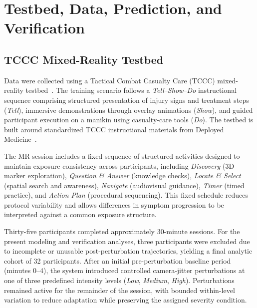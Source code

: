 \documentclass[review]{vgtc}              %
\begin{document}
\section{Testbed, Data, Prediction, and Verification}\label{sec:method}

\subsection{TCCC Mixed-Reality Testbed}\label{sec:testbed}

Data were collected using a Tactical Combat Casualty Care (TCCC) mixed-reality testbed~\cite{Harper2021AR, Stanney2022AUGMED, Laxton2025MobileXR}. The training scenario follows a \textit{Tell--Show--Do} instructional sequence comprising structured presentation of injury signs and treatment steps (\textit{Tell}), immersive demonstrations through overlay animations (\textit{Show}), and guided participant execution on a manikin using casualty-care tools (\textit{Do}). The testbed is built around standardized TCCC instructional materials from Deployed Medicine~\cite{DeployedMedicine2025}.

The MR session includes a fixed sequence of structured activities designed to maintain exposure consistency across participants, including \textit{Discovery} (3D marker exploration), \textit{Question \& Answer} (knowledge checks), \textit{Locate \& Select} (spatial search and awareness), \textit{Navigate} (audiovisual guidance), \textit{Timer} (timed practice), and \textit{Action Plan} (procedural sequencing). This fixed schedule reduces protocol variability and allows differences in symptom progression to be interpreted against a common exposure structure.

Thirty-five participants completed approximately 30-minute sessions. For the present modeling and verification analyses, three participants were excluded due to incomplete or unusable post-perturbation trajectories, yielding a final analytic cohort of 32 participants. After an initial pre-perturbation baseline period (minutes 0--4), the system introduced controlled camera-jitter perturbations at one of three predefined intensity levels (\textit{Low}, \textit{Medium}, \textit{High}). Perturbations remained active for the remainder of the session, with bounded within-level variation to reduce adaptation while preserving the assigned severity condition.
\end{document}
